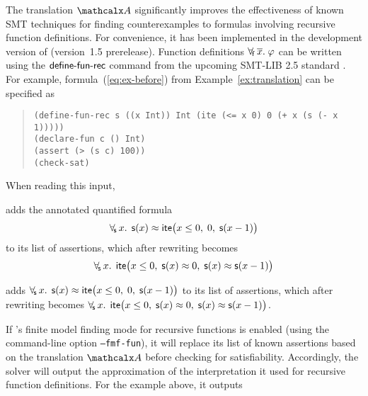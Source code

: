 The translation $\conv$ significantly improves the effectiveness of known SMT
techniques for finding counterexamples to formulas involving recursive
function definitions.
For convenience, it
has been implemented in the development version of \cvc %
(version~1.5 prerelease).
Function definitions $\forall_{\!\mathsf{f}\:} \overline{x}.\; \varphi$ can be written using the $\mathsf{define}\text{-}\mathsf{fun}\text{-}\mathsf{rec}$ command
from the upcoming SMT-LIB 2.5 standard \cite{smtlib25}.
For example, formula~(\ref{eq:ex-before}) from Example~\ref{ex:translation}
can be specified as %
%
\begin{quote}
\begin{verbatim}
(define-fun-rec s ((x Int)) Int (ite (<= x 0) 0 (+ x (s (- x 1)))))
(declare-fun c () Int)
(assert (> (s c) 100))
(check-sat)
\end{verbatim}
\end{quote}
%
When reading this input,
\begin{longv}%
\cvc adds the annotated quantified formula
$$\forall_{\!\mathsf{s}\:} x.\;\, \mathsf{s}( x ) \approx \mathsf{ite}\bigl( x \leq 0,\; 0,\; \mathsf{s}( x-1 )\bigr)$$
to its list of assertions,
which after rewriting becomes
$$\forall_{\!\mathsf{s}\:} x.\;\, \mathsf{ite}\bigl( x \leq 0,\; \mathsf{s}( x ) \approx 0,\; \mathsf{s}( x ) \approx \mathsf{s}( x-1 ) \bigr)$$
\end{longv}%
\begin{shortv}%
\cvc adds
$\forall_{\!\mathsf{s}\:} x.\;\, \mathsf{s}( x ) \approx \mathsf{ite}\bigl( x \leq 0,\; 0,\; \mathsf{s}( x-1 )\bigr)$
to its list of assertions,
which after rewriting becomes
$\forall_{\!\mathsf{s}\:} x.\;\, \mathsf{ite}\bigl( x \leq 0,\; \mathsf{s}( x ) \approx 0,\; \mathsf{s}( x ) \approx \mathsf{s}( x-1 ) \bigr)$. \end{shortv}%
If \cvc's finite model finding mode for recursive functions is enabled (using
the command-line option \texttt{--fmf-fun}), it will replace its list of known
assertions based on the translation $\conv$ before checking for satisfiability.
Accordingly, the solver will output the approximation of the interpretation it
used for recursive function definitions. 
For the example above, it outputs
